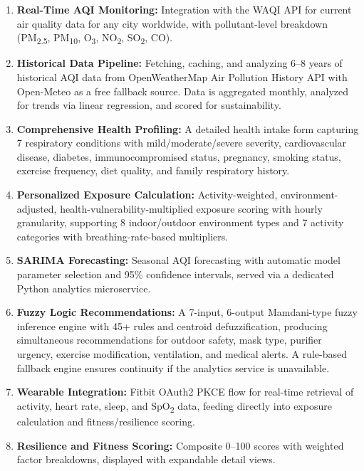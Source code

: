 \documentclass[12pt,a4paper]{report}
\begin{document}
\begin{enumerate}[leftmargin=*]
  \item \textbf{Real-Time AQI Monitoring:} Integration with the WAQI API for current air quality data for any city worldwide, with pollutant-level breakdown (PM\textsubscript{2.5}, PM\textsubscript{10}, O\textsubscript{3}, NO\textsubscript{2}, SO\textsubscript{2}, CO).

  \item \textbf{Historical Data Pipeline:} Fetching, caching, and analyzing 6--8 years of historical AQI data from OpenWeatherMap Air Pollution History API with Open-Meteo as a free fallback source. Data is aggregated monthly, analyzed for trends via linear regression, and scored for sustainability.

  \item \textbf{Comprehensive Health Profiling:} A detailed health intake form capturing 7 respiratory conditions with mild/moderate/severe severity, cardiovascular disease, diabetes, immunocompromised status, pregnancy, smoking status, exercise frequency, diet quality, and family respiratory history.

  \item \textbf{Personalized Exposure Calculation:} Activity-weighted, environment-adjusted, health-vulnerability-multiplied exposure scoring with hourly granularity, supporting 8 indoor/outdoor environment types and 7 activity categories with breathing-rate-based multipliers.

  \item \textbf{SARIMA Forecasting:} Seasonal AQI forecasting with automatic model parameter selection and 95\% confidence intervals, served via a dedicated Python analytics microservice.

  \item \textbf{Fuzzy Logic Recommendations:} A 7-input, 6-output Mamdani-type fuzzy inference engine with 45+ rules and centroid defuzzification, producing simultaneous recommendations for outdoor safety, mask type, purifier urgency, exercise modification, ventilation, and medical alerts. A rule-based fallback engine ensures continuity if the analytics service is unavailable.

  \item \textbf{Wearable Integration:} Fitbit OAuth2 PKCE flow for real-time retrieval of activity, heart rate, sleep, and SpO\textsubscript{2} data, feeding directly into exposure calculation and fitness/resilience scoring.

  \item \textbf{Resilience and Fitness Scoring:} Composite 0--100 scores with weighted factor breakdowns, displayed with expandable detail views.


\end{enumerate}
\end{document}
